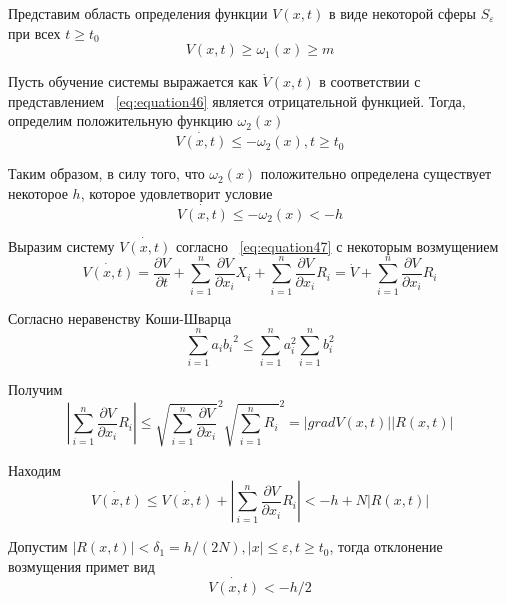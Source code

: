 Представим область определения функции $V(x,t)$  в виде некоторой сферы $S_\varepsilon$ при всех $t \geq t_0$
\begin{equation}
    \label{eq:equation50}
    V(x,t) \geq \omega_1(x) \geq m
\end{equation}

Пусть обучение системы выражается как $\dot{V}(x,t)$ в соответствии с представлением ~\cref{eq:equation46} является отрицательной функцией. Тогда, определим положительную функцию $\omega_2(x)$
\begin{equation}
    \label{eq:equation50}
    \dot{V(x,t)} \leq -\omega_2(x) , t \geq t_0
\end{equation}

Таким образом, в силу того, что $\omega_2(x)$ положительно определена существует некоторое $h$, которое удовлетворит условие
\begin{equation}
    \label{eq:equation50}
    \dot{V(x,t)} \leq -\omega_2(x) < -h
\end{equation}

Выразим систему $\dot{V(x,t)}$ согласно ~\cref{eq:equation47} с некоторым возмущением 
\begin{equation}
    \label{eq:equation51}
    \dot{V(x,t)} = \frac{\partial V}{\partial t} + \sum_{i=1}^n{\frac{\partial V}{\partial x_i}}X_i + \sum_{i=1}^n{\frac{\partial V}{\partial x_i}}R_i = \dot{V} + \sum_{i=1}^n{\frac{\partial V}{\partial x_i}}R_i
\end{equation}

Согласно неравенству Коши-Шварца ~\cite{Korn}
\begin{equation}
    \label{eq:equation52}
    \sum^n_{i=1}{a_ib_i}^2 \leq \sum_{i=1}^n{a^2_i} \sum_{i=1}^n{b^2_i} 
\end{equation}

Получим
\begin{equation}
    \label{eq:equation53}
    |\sum_{i=1}^n{\frac{\partial V}{\partial x_i}}R_i| \leq {\sqrt {\sum_{i=1}^n{\frac{\partial V}{\partial x_i}}}}^2 {\sqrt{\sum_{i=1}^n{R_i}}^2} = |gradV(x,t)||R(x,t)|
\end{equation}

Находим
\begin{equation}
    \label{eq:equation54}
    \dot{V(x,t)} \leq \dot{V(x,t)} +  |\sum_{i=1}^n{\frac{\partial V}{\partial x_i}}R_i| < -h + N |R(x,t)|
\end{equation}

Допустим $|R(x,t)| < \delta_1 = h/(2N), |x| \leq \varepsilon, t \geq t_0$, тогда отклонение возмущения примет вид
\begin{equation}
    \label{eq:equation55}
    \dot{V(x,t)}  < -h/2
\end{equation}


